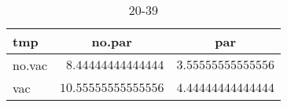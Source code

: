 %
\begin{table}[!tbp]
\caption{20-39\label{20-39}} 
\begin{center}
\begin{tabular}{lrr}
\hline\hline
\multicolumn{1}{l}{tmp}&\multicolumn{1}{c}{no.par}&\multicolumn{1}{c}{par}\tabularnewline
\hline
no.vac&$ 8.44444444444444$&$3.55555555555556$\tabularnewline
vac&$10.55555555555556$&$4.44444444444444$\tabularnewline
\hline
\end{tabular}
\end{center}
\end{table}

